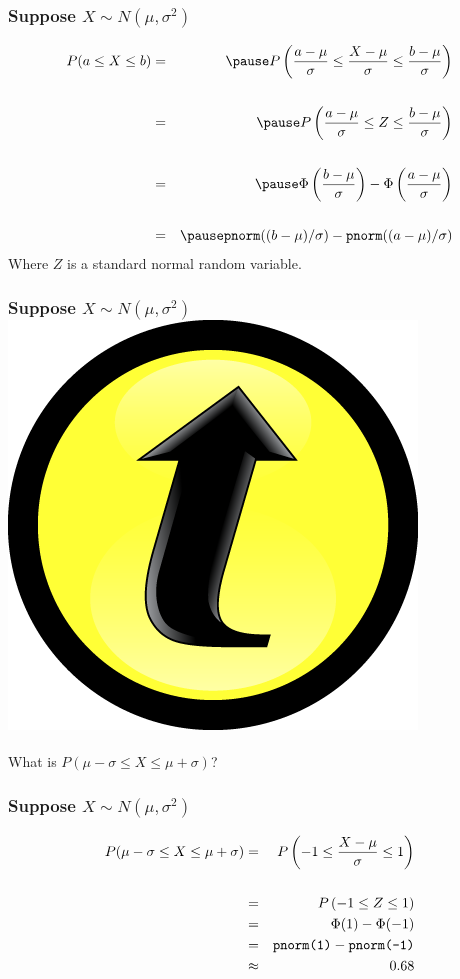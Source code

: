 \documentclass[handout]{beamer}
\begin{document}
\begin{frame}
\frametitle{Suppose $X \sim N(\mu, \sigma^2)$}


\begin{eqnarray*}
	P(a \leq X \leq b) &=& \pause P\left( \frac{a - \mu}{\sigma} \leq \frac{X - \mu}{\sigma} \leq \frac{b-\mu}{\sigma} \right)\\ \\ 
	&=& \pause P\left( \frac{a - \mu}{\sigma} \leq Z \leq \frac{b-\mu}{\sigma} \right)\\ \\ 
	&=& \pause \Phi\left( \frac{b-\mu}{\sigma}\right) - \Phi\left( \frac{a - \mu}{\sigma}\right)\\ \\
	&=&\pause \mbox{\texttt{pnorm}}((b-\mu)/\sigma) -  \mbox{\texttt{pnorm}}((a-\mu)/\sigma)
\end{eqnarray*}
Where $Z$ is a standard normal random variable.
\end{frame}
\begin{frame}
\frametitle{Suppose $X \sim N(\mu, \sigma^2)$\hfill \includegraphics[scale = 0.05]{./images/clicker}}
What is $P(\mu - \sigma \leq X \leq \mu + \sigma)$?
\end{frame}

\begin{frame}
\frametitle{Suppose $X \sim N(\mu, \sigma^2)$}

\begin{eqnarray*}
P(\mu - \sigma \leq X \leq \mu + \sigma) &=& P\left( -1 \leq \frac{X-\mu}{\sigma} \leq 1\right)\\ \\
	&=& P\left( -1 \leq Z \leq 1\right)\\
	&=& \Phi(1) - \Phi(-1)\\
	&=& \mbox{\texttt{pnorm(1)}} -  \mbox{\texttt{pnorm(-1)}}\\
	&\approx& 0.68
\end{eqnarray*}
\end{frame}
\end{document}
